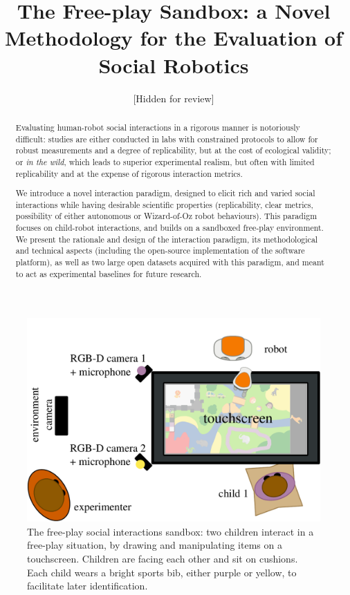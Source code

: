 \documentclass[sigconf]{acmart}
\title{The Free-play Sandbox: a Novel Methodology for the Evaluation of Social Robotics}
\author{[Hidden for review]}
\begin{document}
\begin{abstract}

Evaluating human-robot social interactions in a rigorous manner is notoriously
difficult: studies are either conducted in labs
with constrained protocols to allow for robust measurements and a degree of
replicability, but at the cost of ecological validity; or \emph{in the wild},
which leads to superior experimental realism, but often with limited
replicability and at the expense of rigorous interaction metrics.

We introduce a novel interaction paradigm, designed to elicit rich
and varied social interactions while having desirable scientific properties
(replicability, clear metrics, possibility of either autonomous or Wizard-of-Oz
robot behaviours). This paradigm focuses on child-robot interactions, and
builds on a sandboxed free-play environment. We present the
rationale and design of the interaction paradigm, its 
methodological and technical aspects (including the open-source
implementation of the software platform), as well as two large open datasets
acquired with this paradigm, and meant to act as experimental baselines for
future research.

\end{abstract}

\maketitle

\begin{figure}
    \centering
    \includegraphics[width=0.9\columnwidth]{setup_top}
    \caption{The free-play social interactions sandbox: two children interact in
    a free-play situation, by drawing and manipulating items on a touchscreen.
    Children are facing each other and sit on cushions. Each child wears a
    bright sports bib, either purple or yellow, to facilitate later
    identification.}

    \label{fig|freeplay}
\end{figure}
\end{document}
